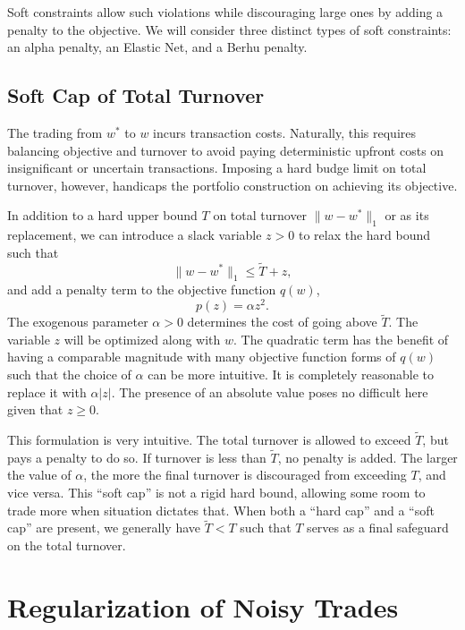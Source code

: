 \documentclass[11pt, letterpaper]{article}
\begin{document}
Soft constraints allow such violations while discouraging large ones by adding a penalty to the objective. We will consider three
distinct types of soft constraints: an alpha penalty, an Elastic Net, and a Berhu penalty.

\subsection{Soft Cap of Total Turnover}
The trading from $w^*$ to $w$ incurs transaction costs. Naturally, this requires balancing objective and turnover to avoid
paying deterministic upfront costs on insignificant or uncertain transactions. Imposing a hard budge limit on total turnover,
however, handicaps the portfolio construction on achieving its objective.

In addition to a hard upper bound $T$ on total turnover $\lVert w - w^*\rVert_1$ or as its replacement, we can introduce a slack
variable $z > 0$ to relax the hard bound such that
\begin{equation*}
	\lVert w - w^*\rVert_1 \leq \tilde{T} + z,
\end{equation*}
and add a penalty term to the objective function $q(w)$,
\begin{equation*}
	p(z) = \alpha z^2.
\end{equation*}
The exogenous parameter $\alpha > 0$ determines the cost of going above $\tilde{T}$. The variable $z$ will be optimized along
with $w$. The quadratic term has the benefit of having a comparable magnitude with many objective function forms of $q(w)$ such
that the choice of $\alpha$ can be more intuitive. It is completely reasonable to replace it with $\alpha |z|$. The presence of
an absolute value poses no difficult here given that $z \geq 0$.

This formulation is very intuitive. The total turnover is allowed to exceed $\tilde{T}$, but pays a penalty to do so. If
turnover is less than $\tilde{T}$, no penalty is added. The larger the value of $\alpha$, the more the final turnover is
discouraged from exceeding $T$, and vice versa. This ``soft cap'' is not a rigid hard bound, allowing some room to trade more
when situation dictates that. When both a ``hard cap'' and a ``soft cap'' are present, we generally have $\tilde{T} < T$ such
that $T$ serves as a final safeguard on the total turnover.

\section{Regularization of Noisy Trades}
\end{document}
